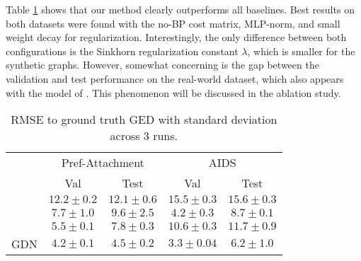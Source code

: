 

Table \ref{tab:ex1-baselines} shows that our method clearly outperforms all baselines. Best results on both datasets were found with the no-BP cost matrix, MLP-norm, and small weight decay for regularization. Interestingly, the only difference between both configurations is the  Sinkhorn regularization constant $\lambda$, which is smaller for the synthetic graphs. However, somewhat concerning is the gap between the validation and test performance on the real-world dataset, which also appears with the model of \cite{bai2019}. This phenomenon will be discussed in the ablation study.


\begin{table}[htbp]
    \addtolength{\tabcolsep}{-1pt}
    \fontsize{9pt}{10.25pt}\selectfont
    \centering
    \renewcommand{\arraystretch}{1.2}
    \begin{tabular}{|l|c|c|c|c|}
        \hline
        \multirow{2}{*}{} & \multicolumn{2}{c|}{Pref-Attachment} & \multicolumn{2}{c|}{AIDS} \\ \hhline{|~|-|-|-|-|}
        & Val & Test & Val & Test \\ \hhline{|=|=|=|=|=|}
        \cite{riba2018} & $12.2 \pm 0.2$ & $12.1 \pm 0.6$ & $15.5 \pm 0.3$  & $15.6 \pm 0.3$ \\ \hline
        \cite{bai2019} & $7.7 \pm 1.0$ & $9.6 \pm 2.5$ & $4.2 \pm 0.3$ & $8.7 \pm 0.1$ \\ \hline
        \cite{li2019} & $5.5 \pm 0.1 $ & $7.8 \pm 0.3$ & $10.6 \pm 0.3$ & $11.7 \pm 0.9$ \\ \hline
        GDN & $4.2 \pm 0.1$ & $\boldsymbol{4.5 \pm 0.2}$ & $3.3 \pm 0.04$ & $\boldsymbol{6.2 \pm 1.0}$ \\ \hline
    \end{tabular}
    \caption{RMSE to ground truth GED with standard deviation across 3 runs.}
    \label{tab:ex1-baselines}
\end{table}



